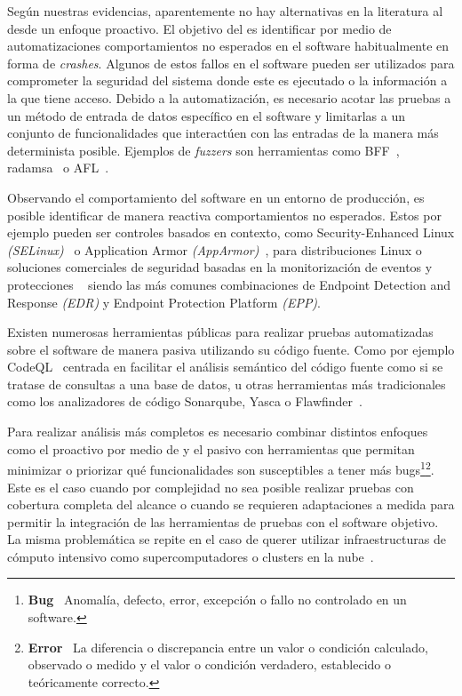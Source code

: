 \documentclass[10pt,conference,a4paper]{IEEEtran}
\begin{document}
Según nuestras evidencias, aparentemente no hay alternativas en la literatura al {\fz} desde un enfoque proactivo. El objetivo del {\fz} es identificar por medio de automatizaciones comportamientos no esperados en el software habitualmente en forma de \textit{crashes}. Algunos de estos fallos en el software pueden ser utilizados para comprometer la seguridad del sistema donde este es ejecutado o la información a la que tiene acceso. Debido a la automatización, es necesario acotar las pruebas a un método de entrada de datos específico en el software y limitarlas a un conjunto de funcionalidades que interactúen con las entradas de la manera más determinista posible. Ejemplos de \textit{fuzzers} son herramientas como BFF~\cite{fuzz_tool_BFF}, radamsa~\cite{fuzz_tool_radamsa} o AFL~\cite{fuzz_tool_afl}.

Observando el comportamiento del software en un entorno de producción, es posible identificar de manera reactiva comportamientos no esperados. Estos por ejemplo pueden ser controles basados en contexto, como Security-Enhanced Linux {\em (SELinux)}~\cite{NSA_SELinux} o Application Armor \textit{(AppArmor)}~\cite{Linux_AppArmor}, para distribuciones Linux o soluciones comerciales de seguridad basadas en la monitorización de eventos y protecciones ~\cite{edr_wuml,xdr_ref} siendo las más comunes combinaciones de Endpoint Detection and Response \textit{(EDR)} y Endpoint Protection Platform \textit{(EPP)}.

Existen numerosas herramientas públicas para realizar pruebas automatizadas sobre el software de manera pasiva utilizando su código fuente. Como por ejemplo CodeQL~\cite{src_tool_codeql} centrada en facilitar el análisis semántico del código fuente como si se tratase de consultas a una base de datos, u otras herramientas más tradicionales como los analizadores de código Sonarqube, Yasca o Flawfinder~\cite{src_tool_list-NIST}.

Para realizar análisis más completos es necesario combinar distintos enfoques como el proactivo por medio de {\fz} y el pasivo con herramientas que permitan minimizar o priorizar qué funcionalidades son susceptibles a tener más bugs\footnote{\textbf{Bug}~\cite{IEEE_SW_standar}
Anomalía, defecto, error, excepción o fallo no controlado en un software.
}\footnote{\textbf{Error}~\cite{ISO_stand_computer-data}
La diferencia o discrepancia entre un valor o condición calculado, observado o medido y el valor o condición verdadero, establecido o teóricamente correcto.
}. Este es el caso cuando por complejidad no sea posible realizar pruebas con cobertura completa del alcance o cuando se requieren adaptaciones a medida para permitir la integración de las herramientas de pruebas con el software objetivo. La misma problemática se repite en el caso de querer utilizar infraestructuras de cómputo intensivo como supercomputadores o clusters en la nube~\cite{Azure_doc-CycleCloud_slurm}.
\end{document}
